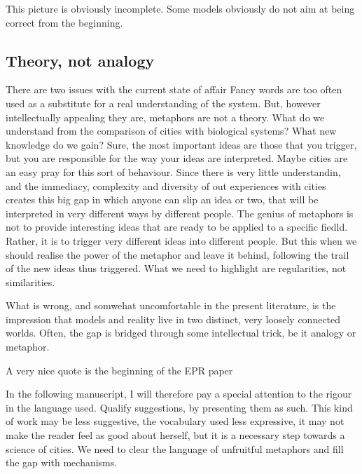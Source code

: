 This picture is obviously incomplete. Some models obviously do not aim at being
correct from the beginning.

\subsection{Theory, not analogy}
\label{sub:theory_not_analogy}




There are two issues with the current state of affair 
Fancy words are too often used as a substitute for a real
understanding of the system. But, however intellectually appealing they are,
metaphors are not a theory. What do we understand from the comparison of cities
with biological systems? What new knowledge do we gain? Sure, the most important
ideas are those that you trigger, but you are responsible for the way your ideas
are interpreted.  Maybe cities are an easy pray for this sort of behaviour.
Since there is very little understandin, and the immediacy, complexity and
diversity of out experiences with cities creates this big gap in which anyone
can slip an idea or two, that will be interpreted in very different ways by
different people. The genius of metaphors is not to provide interesting ideas
that are ready to be applied to a specific fiedld. Rather, it is to trigger very
different ideas into different people. But this when we should realise the power
of the metaphor and leave it behind, following the trail of the new ideas thus
triggered. What we need to highlight are regularities, not similarities.

What is wrong, and somwehat uncomfortable in the present literature, is the
impression that models and reality live in two distinct, very loosely connected
worlds. Often, the gap is bridged through some intellectual trick, be it analogy
or metaphor.

A very nice quote is the beginning of the EPR paper

In the following manuscript, I will therefore pay a special attention to the
rigour in the language used. Qualify suggestions, by presenting them as such.
This kind of work may be less suggestive, the vocabulary used less expressive,
it may not make the reader feel as good about herself, but it is a necessary
step towards a science of cities. We need to clear the language of unfruitful
metaphors and fill the gap with mechanisms.
